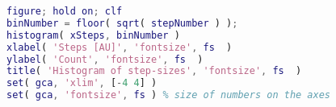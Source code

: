 \begin{lstlisting}[language=matlab]
%% --- PLOT HISTOGRAM OF STEPS ---
figure; hold on; clf
binNumber = floor( sqrt( stepNumber ) );
histogram( xSteps, binNumber )
xlabel( 'Steps [AU]', 'fontsize', fs  )
ylabel( 'Count', 'fontsize', fs  )
title( 'Histogram of step-sizes', 'fontsize', fs  )
set( gca, 'xlim', [-4 4] ) 
set( gca, 'fontsize', fs ) % size of numbers on the axes

\end{lstlisting}